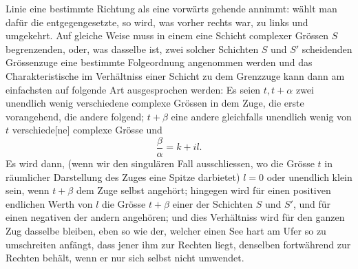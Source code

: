 \clearpage{}
\noindent Linie eine bestimmte Richtung als eine vorwärts gehende annimmt: wählt man dafür die entgegengesetzte, so wird, was vorher rechts war, zu links und umgekehrt. Auf gleiche Weise muss in einem eine Schicht complexer Grössen \(S\) begrenzenden, oder, was dasselbe ist, zwei solcher Schichten \(S\) und \(S'\) scheidenden Grössenzuge eine bestimmte Folgeordnung angenommen werden und das Charakteristische im Verhältniss einer Schicht zu dem Grenzzuge kann dann am einfachsten auf folgende Art ausgesprochen werden: Es seien \(t,t+\alpha\) zwei unendlich wenig verschiedene complexe Grössen in dem Zuge, die erste vorangehend, die andere folgend; \(t+\beta\) eine andere gleichfalls unendlich wenig von \(t\) verschiede[ne] complexe Grösse und
\[
\frac\beta\alpha=k+il.
\]
\noindent Es wird dann, (wenn wir den singulären Fall ausschliessen, wo die Grösse \(t\) in räumlicher Darstellung des Zuges eine Spitze darbietet) \(l=0\) oder unendlich klein sein, wenn \(t+\beta\) dem Zuge selbst angehört; hingegen wird für einen positiven endlichen Werth von \(l\) die Grösse \(t+\beta\) einer der Schichten \(S\) und \(S'\), und für einen negativen der andern angehören; und dies Verhältniss wird für den ganzen Zug dasselbe bleiben, eben so wie der, welcher einen See hart am Ufer so zu umschreiten anfängt, dass jener ihm zur Rechten liegt, denselben fortwährend zur Rechten behält, wenn er nur sich selbst nicht umwendet.

